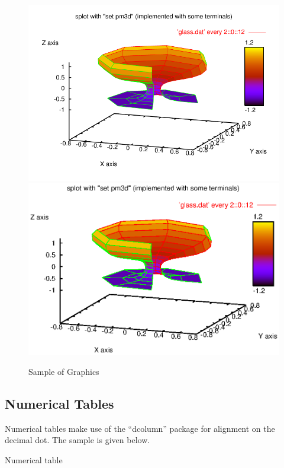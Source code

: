 \documentclass{cnbwp}
\begin{document}
\begin{figure}[hbt]
\caption{Sample of Graphics}
\ifpdf
\includegraphics[width=\textwidth]{graph18.pdf}
\else
\includegraphics[width=\textwidth]{graph18.eps}
\fi
\medskip
{}
\end{figure}

\subsection{Numerical Tables}
Numerical tables make use of the ``dcolumn'' package for alignment on the decimal dot. The sample is
given below.

\begin{table}[hbt]
\caption{Numerical table}\medskip

\end{table}
\end{document}
